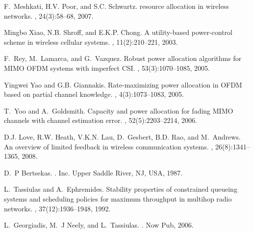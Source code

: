 \documentclass[11pt,journal, onecolumn]{./IEEEtran}
\begin{document}
\begin{thebibliography}{10}

F.~Meshkati, {H.V.} Poor, and {S.C.} Schwartz.
 resource allocation in wireless networks.
, 24(3):58--68, 2007.

Mingbo Xiao, {N.B.} Shroff, and {E.K.P.} Chong.
\newblock A utility-based power-control scheme in wireless cellular systems.
, 11(2):210--221, 2003.

F.~Rey, M.~Lamarca, and G.~Vazquez.
\newblock Robust power allocation algorithms for {MIMO} {OFDM} systems with
  imperfect {CSI}.
, 53(3):1070--1085,
  2005.

Yingwei Yao and {G.B.} Giannakis.
\newblock Rate-maximizing power allocation in {OFDM} based on partial channel
  knowledge.
,
  4(3):1073--1083, 2005.

T.~Yoo and A.~Goldsmith.
\newblock Capacity and power allocation for fading {MIMO} channels with channel
  estimation error.
, 52(5):2203--2214,
  2006.

{D.J.} Love, {R.W.} Heath, {V.K.N.} Lau, D.~Gesbert, {B.D.} Rao, and
  M.~Andrews.
\newblock An overview of limited feedback in wireless communication systems.
,
  26(8):1341--1365, 2008.

D.~P Bertsekas.
.
 Inc. Upper Saddle River, {NJ,} {USA}, 1987.

L.~Tassiulas and A.~Ephremides.
\newblock Stability properties of constrained queueing systems and scheduling
  policies for maximum throughput in multihop radio networks.
, 37(12):1936--1948,
  1992.

L.~Georgiadis, M.~J Neely, and L.~Tassiulas.
.
\newblock Now Pub, 2006.


\end{thebibliography}
\end{document}
